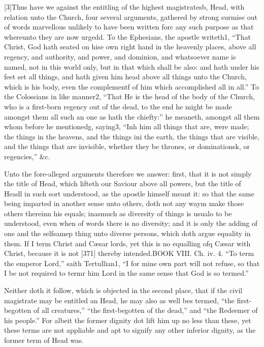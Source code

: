 [3]Thus have we against the entitling of the highest magistratesb, Head, with relation unto the Church, four several arguments, gathered by strong surmise out of words marvellous unlikely to have been written forc any such purpose as that whereunto they are now urgedd. To the Ephesians, the apostle writeth1, “That Christ, God hath seated on hise own right hand in the heavenly places, above all regency, and authority, and power, and dominion, and whatsoever name is named, not in this world only, but in that which shall be also: and hath under his feet set all things, and hath given him head above all things unto the Church, which is his body, even the complementf of him which accomplished all in all.” To the Colossians in like manner2, “That He is the head of the body of the Church, who is a first-born regency out of the dead, to the end he might be made amongst them all such an one as hath the chiefty:” he meaneth, amongst all them whom before he mentionedg, saying3, “Inh him all things that are, were made; the things in the heavens, and the things ini the earth, the things that are visible, and the things that are invisible, whether they be thrones, or dominationsk, or regencies,” &c.

Unto the fore-alleged arguments therefore we answer: first, that it is not simply the title of Head, which lifteth our Saviour above all powers, but the title of Headl in such sort understood, as the apostle himself meant it: so that the same being imparted in another sense unto others, doth not any waym make those others thereinn his equals; inasmuch as diversity of things is usualo to be understood, even when of words there is no diversity; and it is only the adding of one and the selfsamep thing unto diverse persons, which doth argue equality in them. If I term Christ and Cæsar lords, yet this is no equalling ofq Cæsar with Christ, because it is not [371] thereby intended.BOOK VIII. Ch. iv. 4. “To term the emperor Lord,” saith Tertullian1, “I for mine own part will not refuse, so that I be not required to termr him Lord in the same sense that God is so termed.”

Neither doth it follow, which is objected in the second place, that if the civil magistrate may be entitled an Head, he may also as well bes termed, “the first-begotten of all creatures,” “the first-begotten of the dead,” and “the Redeemer of his people.” For albeit the former dignity dot lift him up no less than these, yet these terms are not appliable and apt to signify any other inferior dignity, as the former term of Head was.

